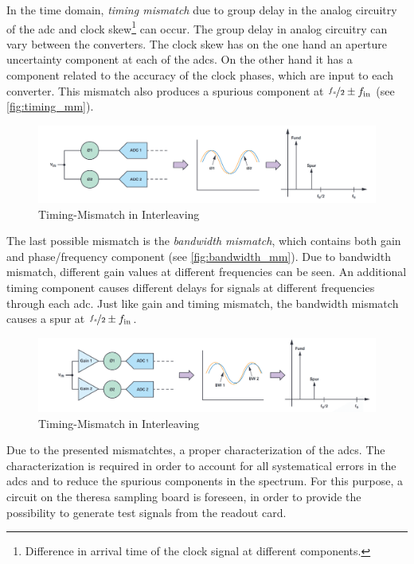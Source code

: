 In the time domain, \textit{timing mismatch} due to group delay in the analog circuitry of the \gls{adc} and clock skew\footnote{Difference in arrival time of the clock signal at different components.} can occur. 
The group delay in analog circuitry can vary between the converters. 
The clock skew has on the one hand an aperture uncertainty component at each of the \glspl{adc}. 
On the other hand it has a component related to the accuracy of the clock phases, which are input to each converter. \cite{Harris2019} 
This mismatch also produces a spurious component at $\nicefrac{f_s}{2} \pm f_\text{in}$ (see \autoref{fig:timing_mm}).

\begin{figure}[tbh]
	\centering
	\includegraphics[width = \textwidth]{chap/02-theory/img/timing_mm}
	\caption{Timing-Mismatch in Interleaving \cite{Harris2019}}
	\label{fig:timing_mm}
\end{figure}

The last possible mismatch is the \textit{bandwidth mismatch}, which contains both gain and phase/frequency component (see \autoref{fig:bandwidth_mm}). 
Due to bandwidth mismatch, different gain values at different frequencies can be seen. 
An additional timing component causes different delays for signals at different frequencies through each \gls{adc}. 
Just like gain and timing mismatch, the bandwidth mismatch causes a spur at $\nicefrac{f_s}{2} \pm f_\text{in}$.

\begin{figure}[tbh]
	\centering
	\includegraphics[width = \textwidth]{chap/02-theory/img/bandwidth_mm}
	\caption{Timing-Mismatch in Interleaving \cite{Harris2019}}
	\label{fig:bandwidth_mm}
\end{figure}

Due to the presented mismatchtes, a proper characterization of the \glspl{adc}.
The characterization is required in order to account for all systematical errors in the \glspl{adc} and to reduce the spurious components in the spectrum.
For this purpose, a circuit on the \gls{theresa} sampling board is foreseen, in order to provide the possibility to generate test signals from the readout card.

